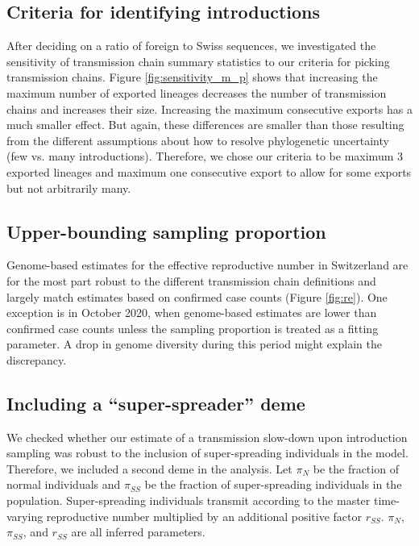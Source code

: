\documentclass[9pt,twoside,lineno]{pnas-new}
\begin{document}
\subsection{Criteria for identifying introductions}
After deciding on a ratio of foreign to Swiss sequences, we investigated the sensitivity of transmission chain summary statistics to our criteria for picking transmission chains. Figure \ref{fig:sensitivity_m_p} shows that increasing the maximum number of exported lineages decreases the number of transmission chains and increases their size. Increasing the maximum consecutive exports has a much smaller effect. But again, these differences are smaller than those resulting from the different assumptions about how to resolve phylogenetic uncertainty (few vs. many introductions). Therefore, we chose our criteria to be maximum 3 exported lineages and maximum one consecutive export to allow for some exports but not arbitrarily many. 

\subsection{Upper-bounding sampling proportion}
Genome-based estimates for the effective reproductive number in Switzerland are for the most part robust to the different transmission chain definitions and largely match estimates based on confirmed case counts (Figure \ref{fig:re}). One exception is in October 2020, when genome-based estimates are lower than confirmed case counts unless the sampling proportion is treated as a fitting parameter. A drop in genome diversity during this period might explain the discrepancy. 

\subsection{Including a ``super-spreader'' deme}
We checked whether our estimate of a transmission slow-down upon introduction sampling was robust to the inclusion of super-spreading individuals in the model. Therefore, we included a second deme in the analysis. Let $\pi_N$ be the fraction of normal individuals and $\pi_{SS}$ be the fraction of super-spreading individuals in the population. Super-spreading individuals transmit according to the master time-varying reproductive number multiplied by an additional positive factor $r_{SS}$. $\pi_N$, $\pi_{SS}$, and $r_{SS}$ are all inferred parameters. 
\end{document}
